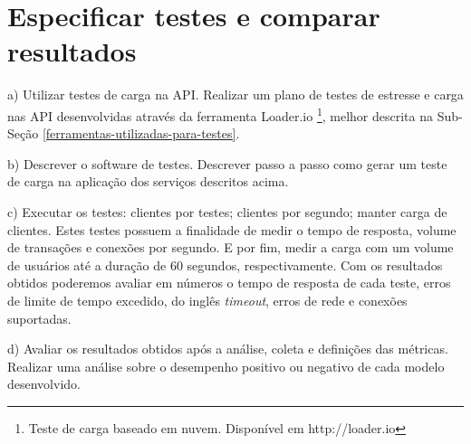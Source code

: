 \section{Especificar testes e comparar resultados}

  \begin{compactitem}
    \item[a)] Utilizar testes de carga na \ac{API}. Realizar um plano de testes de 
    estresse e carga nas \ac{API} desenvolvidas através
    da ferramenta Loader.io \footnote[7]{Teste de carga baseado em nuvem. Disponível em http://loader.io},
    melhor descrita na Sub-Seção \ref{ferramentas-utilizadas-para-testes}.
    
    \item[b)] Descrever o software de testes. Descrever passo a passo como gerar um teste de carga 
    na aplicação dos serviços descritos acima.
    
    \item[c)] Executar os testes: clientes por testes; clientes por segundo; manter carga de clientes.
    Estes testes possuem a finalidade de medir o tempo de resposta, volume de transações e conexões por segundo. E por fim, 
    medir a carga com um volume de usuários até a duração de 60 segundos, respectivamente. 
    Com os resultados obtidos poderemos avaliar em números o tempo de resposta de cada teste,
    erros de limite de tempo excedido, do inglês \textit{timeout}, erros de rede e conexões suportadas. 
    
    \item[d)] Avaliar os resultados obtidos após a análise, coleta e definições das métricas. Realizar uma análise sobre o 
    desempenho positivo ou negativo de cada modelo desenvolvido.
    
    
  \end{compactitem}



